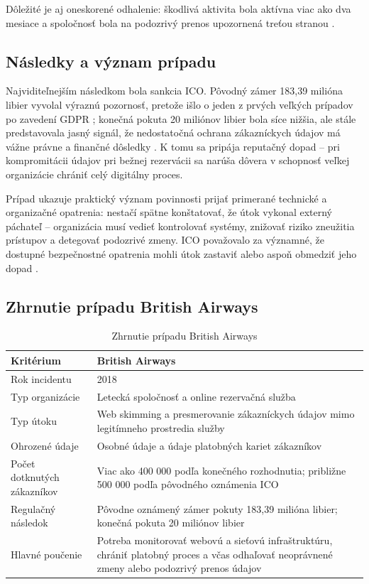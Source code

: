 Dôležité je aj oneskorené odhalenie: škodlivá aktivita bola aktívna viac ako dva mesiace a spoločnosť bola na podozrivý prenos upozornená treťou stranou \cite{simmons2020BritishAirwaysPenalty}.

\subsection{Následky a význam prípadu}

Najviditeľnejším následkom bola sankcia ICO. Pôvodný zámer 183,39 milióna libier vyvolal výraznú pozornosť, pretože išlo o jeden z prvých veľkých prípadov po zavedení GDPR \cite{edpb2019BritishAirways}; konečná pokuta 20 miliónov libier bola síce nižšia, ale stále predstavovala jasný signál, že nedostatočná ochrana zákazníckych údajov má vážne právne a finančné dôsledky \cite{gdprRegister2020BritishAirways}. K tomu sa pripája reputačný dopad -- pri kompromitácii údajov pri bežnej rezervácii sa narúša dôvera v schopnosť veľkej organizácie chrániť celý digitálny proces.

Prípad ukazuje praktický význam povinnosti prijať primerané technické a organizačné opatrenia: nestačí spätne konštatovať, že útok vykonal externý páchateľ -- organizácia musí vedieť kontrolovať systémy, znižovať riziko zneužitia prístupov a detegovať podozrivé zmeny. ICO považovalo za významné, že dostupné bezpečnostné opatrenia mohli útok zastaviť alebo aspoň obmedziť jeho dopad \cite{simmons2020BritishAirwaysPenalty}.

\subsection{Zhrnutie prípadu British Airways}

\begin{table}[htbp]
    \centering
    \caption{Zhrnutie prípadu British Airways}
    \label{tab:british-airways-summary}
    \begin{tabularx}{\textwidth}{@{}p{}X@{}}
        \toprule
        \textbf{Kritérium} & \textbf{British Airways} \\
        \midrule
        Rok incidentu & 2018 \\
        Typ organizácie & Letecká spoločnosť a online rezervačná služba \\
        Typ útoku & Web skimming a presmerovanie zákazníckych údajov mimo legitímneho prostredia služby \\
        Ohrozené údaje & Osobné údaje a údaje platobných kariet zákazníkov \\
        Počet dotknutých zákazníkov & Viac ako 400 000 podľa konečného rozhodnutia; približne 500 000 podľa pôvodného oznámenia ICO \\
        Regulačný následok & Pôvodne oznámený zámer pokuty 183,39 milióna libier; konečná pokuta 20 miliónov libier \\
        Hlavné poučenie & Potreba monitorovať webovú a sieťovú infraštruktúru, chrániť platobný proces a včas odhaľovať neoprávnené zmeny alebo podozrivý prenos údajov \\
        \bottomrule
    \end{tabularx}
\end{table}
